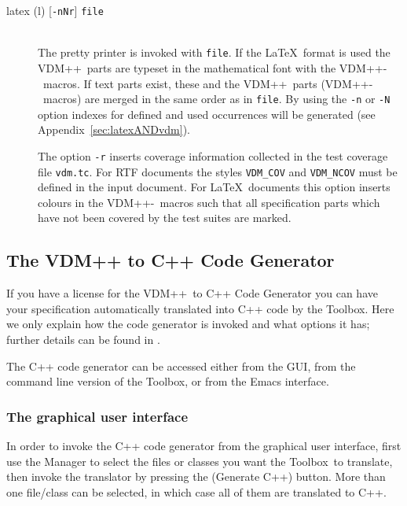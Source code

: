 \documentclass[\pformat,12pt]{article}
\newcommand{\vdmslpp}{VDM++}
\newcommand{\Toolbox}{Toolbox}
\DeclareRobustCommand{\VdmSlPp}{VDM++-\VdmSl}
\newcommand{\guicmd}[1]{{\sf #1}}
\begin{document}
\begin{description} 

\item[latex (l) \mbox{[{\tt -nNr}]} {\tt file}] \mbox{}\\
  The pretty printer is invoked with {\tt file}.  If the \LaTeX\ format is
  used the \vdmslpp\ 
  parts are typeset in the mathematical font with the \VdmSlPp\ 
  macros.  If text parts exist, these and the \vdmslpp\ parts
  (\VdmSlPp\ macros) are merged in the same order as in {\tt file}.
  By using the {\tt -n} or {\tt -N} option indexes for defined and
  used occurrences will be generated (see
  Appendix~\ref{sec:latexANDvdm}).
  
  The option {\tt -r} inserts coverage information collected in the
test coverage file {\tt vdm.tc}. For RTF documents
the styles {\tt VDM\_COV} and {\tt VDM\_NCOV} must be defined in the
input document.  For \LaTeX\ documents this option inserts colours in
the \VdmSlPp\ macros such that all specification parts which have not
been covered by the test suites are marked.


\end{description}


\newpage
\subsection{The VDM++ to C++ Code Generator}\label{sec:cg}


If you have a license  for the \vdmslpp\ to C++
Code Generator you can have your specification automatically 
translated into C++ code by the \Toolbox. Here we only explain how the
code generator is invoked and what options it has; further details can
be found in .

The C++ code generator can be accessed either from the GUI, from the
command line version of the \Toolbox, or from the Emacs interface.


\subsubsection{The graphical user interface}

In order to invoke the C++ code generator from the graphical user
interface, first use the \guicmd{Manager} to select the files or
classes you want the \Toolbox\ to translate, then invoke the
translator by pressing the 
(\guicmd{Generate C++}) button. More than one file/class can be
selected, in which case all of them are translated to C++.
\end{document}
